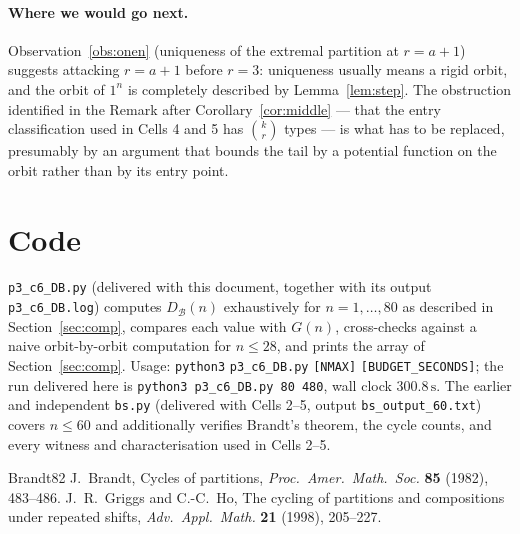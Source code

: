 \documentclass[11pt]{article}
\theoremstyle{definition}
\newcommand{\DB}{D_{\mathcal{B}}}
\renewcommand{\le}{\leqslant}
\newcommand{\NMAX}{80}
\newcommand{\TOTALSEC}{300.8\,\mathrm{s}}
\begin{document}
\paragraph{Where we would go next.}  Observation~\ref{obs:onen} (uniqueness of the extremal partition at $r=a+1$)
suggests attacking $r=a+1$ before $r=3$: uniqueness usually means a rigid orbit, and the orbit of $1^n$ is
completely described by Lemma~\ref{lem:step}.  The obstruction identified in the Remark after
Corollary~\ref{cor:middle} --- that the entry classification used in Cells 4 and 5 has $\binom{k}{r}$ types --- is
what has to be replaced, presumably by an argument that bounds the tail by a potential function on the orbit rather
than by its entry point.

\appendix
\section{Code}\label{app:code}

\texttt{p3\_c6\_DB.py} (delivered with this document, together with its output \texttt{p3\_c6\_DB.log}) computes
$\DB(n)$ exhaustively for $n=1,\dots,\NMAX$ as described in Section~\ref{sec:comp}, compares each value with
$G(n)$, cross-checks against a naive orbit-by-orbit computation for $n\le28$, and prints the array of
Section~\ref{sec:comp}.  Usage: \texttt{python3} \texttt{p3\_c6\_DB.py} \texttt{[NMAX]} \texttt{[BUDGET\_SECONDS]}; the run
delivered here is
\texttt{python3 p3\_c6\_DB.py 80 480}, wall clock $\TOTALSEC$.  The earlier and independent \texttt{bs.py}
(delivered with Cells 2--5, output \texttt{bs\_output\_60.txt}) covers $n\le60$ and additionally verifies Brandt's
theorem, the cycle counts, and every witness and characterisation used in Cells 2--5.

\begin{thebibliography}{Brandt82}
 J.~Brandt, Cycles of partitions, \emph{Proc.\ Amer.\ Math.\ Soc.} \textbf{85} (1982),
483--486.
 J.~R.~Griggs and C.-C.~Ho, The cycling of partitions and compositions under repeated shifts,
\emph{Adv.\ Appl.\ Math.} \textbf{21} (1998), 205--227.
\end{thebibliography}
\end{document}
